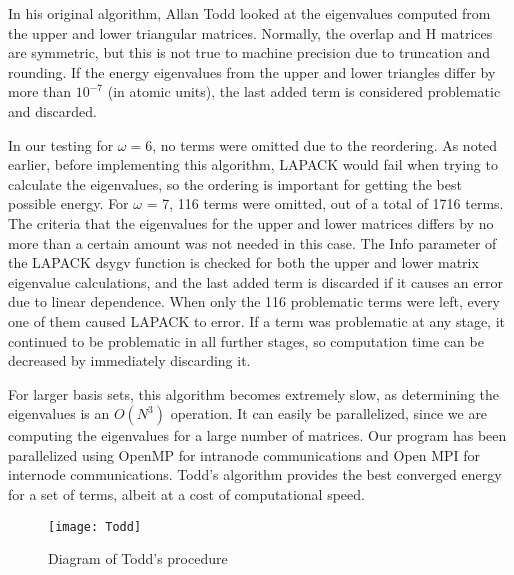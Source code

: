 \documentclass[Dissertation.tex]{subfiles}
\begin{document}
In his original algorithm, Allan Todd looked at the eigenvalues computed from 
the upper and lower triangular matrices. Normally, the overlap and H matrices 
are symmetric, but this is not true to machine precision due to truncation 
and rounding. If the energy eigenvalues from the upper and lower triangles 
differ by more than $10^{-7}$ (in atomic units), the last added term is 
considered problematic and discarded.

In our testing for $\omega = 6$, no terms were omitted due to the reordering. 
As noted earlier, before implementing this algorithm, LAPACK would fail when 
trying to calculate the eigenvalues, so the ordering is important for getting 
the best possible energy. For $\omega$ = 7, 116 terms were omitted, out of a 
total of 1716 terms. The criteria that the eigenvalues for the upper and 
lower matrices differs by no more than a certain amount was not needed in 
this case. The Info parameter of the LAPACK dsygv function is checked for 
both the upper and lower matrix eigenvalue calculations, and the last added 
term is discarded if it causes an error due to linear dependence. When only 
the 116 problematic terms were left, every one of them caused LAPACK to 
error. If a term was problematic at any stage, it continued to be problematic 
in all further stages, so computation time can be decreased by immediately 
discarding it.

For larger basis sets, this algorithm becomes extremely slow, as determining 
the eigenvalues is an $O(N^3)$ operation. It can easily be parallelized, 
since we are computing the eigenvalues for a large number of matrices. Our 
program has been parallelized using OpenMP for intranode communications and 
Open MPI for internode communications. Todd's algorithm provides the best 
converged energy for a set of terms, albeit at a cost of computational speed.

\begin{figure}[H]
	\centering
	{\texttt{[image: Todd]}}
	\caption{Diagram of Todd's procedure}
	\label{fig:Todd}
\end{figure}
\end{document}
